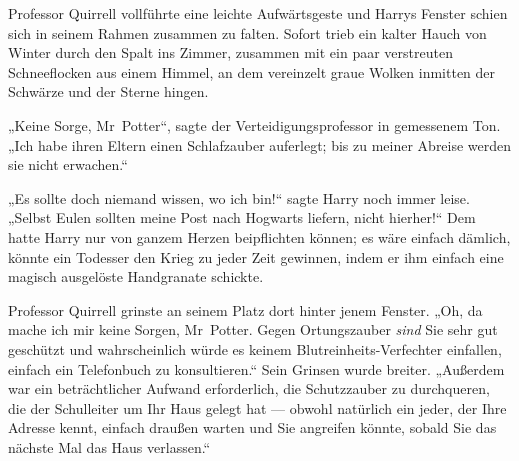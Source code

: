 Professor Quirrell vollführte eine leichte Aufwärtsgeste und Harrys Fenster schien sich in seinem Rahmen zusammen zu falten. Sofort trieb ein kalter Hauch von Winter durch den Spalt ins Zimmer, zusammen mit ein paar verstreuten Schneeflocken aus einem Himmel, an dem vereinzelt graue Wolken inmitten der Schwärze und der Sterne hingen.

„Keine Sorge, Mr~Potter“, sagte der Verteidigungsprofessor in gemessenem Ton.
„Ich habe ihren Eltern einen Schlafzauber auferlegt; bis zu meiner Abreise werden sie nicht erwachen.“

„Es sollte doch niemand wissen, wo ich bin!“ sagte Harry noch immer leise.
„Selbst Eulen sollten meine Post nach Hogwarts liefern, nicht hierher!“ Dem hatte Harry nur von ganzem Herzen beipflichten können; es wäre einfach dämlich, könnte ein Todesser den Krieg zu jeder Zeit gewinnen, indem er ihm einfach eine magisch ausgelöste Handgranate schickte.

Professor Quirrell grinste an seinem Platz dort hinter jenem Fenster.
„Oh, da mache ich mir keine Sorgen, Mr~Potter. Gegen Ortungszauber \emph{sind} Sie sehr gut geschützt und wahrscheinlich würde es keinem Blutreinheits-Verfechter einfallen, einfach ein Telefonbuch zu konsultieren.“ Sein Grinsen wurde breiter.
„Außerdem war ein beträchtlicher Aufwand erforderlich, die Schutzzauber zu durchqueren, die der Schulleiter um Ihr Haus gelegt hat — obwohl natürlich ein jeder, der Ihre Adresse kennt, einfach draußen warten und Sie angreifen könnte, sobald Sie das nächste Mal das Haus verlassen.“

